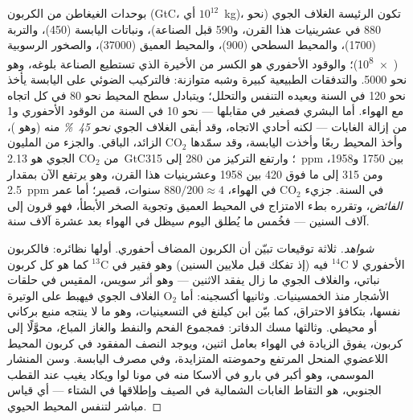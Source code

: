 \begin{proposition}\label{prop:b2:biogeochemical-cycles:carbon}
بوحدات الغيغاطن من الكربون (\unit{GtC}، أي $10^{12}$~kg)، تكون
 الرئيسة الغلاف الجوي (نحو 880 في عشرينيات هذا القرن، و590
قبل الصناعة)، ونباتات اليابسة (450)، والتربة (1700)، والمحيط
السطحي (900)، والمحيط العميق (\num{37000})، والصخور الرسوبية
(\num{e8})؛ والوقود الأحفوري هو الكسر من الأخيرة الذي
تستطيع الصناعة بلوغه، وهو نحو \num{5000}. والتدفقات الطبيعية كبيرة
وشبه متوازنة: فالتركيب الضوئي على اليابسة يأخذ نحو 120 في
السنة ويعيده التنفس والتحلل؛ ويتبادل سطح المحيط
نحو 80 في كل اتجاه مع الهواء. أما  البشري
فصغير في مقابلها --- نحو 10 في السنة من الوقود الأحفوري و1
من إزالة الغابات --- لكنه أحادي الاتجاه، وقد أبقى الغلاف الجوي
\emph{نحو \qty{45}{\%}} منه (وهو \emph{})،
وأخذ المحيط ربعًا وأخذت اليابسة، وقد سمّدها
$\mathrm{CO_2}$ الزائد، الباقي. والجزء من المليون من $\mathrm{CO_2}$ الجوي هو
\qty{2.13}{GtC}؛ وارتفع التركيز من 280 إلى \num{315}~\unit{ppm}
بين 1750 و1958، ومن 315 إلى ما فوق \num{420} بين 1958
وعشرينيات هذا القرن، وهو يرتفع الآن بمقدار \qty{2.5}{ppm} في السنة.  جزيء $\mathrm{CO_2}$ في الهواء، $880/200 \approx 4$ سنوات،
قصير؛ أما عمر \emph{الفائض}، وتقرره بطء
الامتزاج في المحيط العميق وتجوية الصخر الأبطأ، فهو
قرون إلى آلاف السنين --- فخُمس ما يُطلق اليوم سيظل
في الهواء بعد عشرة آلاف سنة.
\end{proposition}
\begin{proof}[شواهد]
ثلاثة توقيعات تبيّن أن الكربون المضاف أحفوري. أولها
نظائره: فالكربون الأحفوري لا $\mathrm{{}^{14}C}$ فيه (إذ تفكك
قبل ملايين السنين) وهو فقير في $\mathrm{{}^{13}C}$ كما هو كل كربون
نباتي، والغلاف الجوي ما زال يفقد الاثنين --- وهو أثر
سويس، المقيس في حلقات الأشجار منذ الخمسينيات. وثانيها أكسجينه:
أما $\mathrm{O_2}$ الغلاف الجوي فيهبط على الوتيرة نفسها، بتكافؤ
الاحتراق، كما بيّن ابن كيلنغ في التسعينيات، وهو ما لا ينتجه
منبع بركاني أو محيطي. وثالثها مسك الدفاتر: فمجموع
الفحم والنفط والغاز المباع، محوَّلًا إلى كربون، يفوق الزيادة
في الهواء بعامل اثنين، ويوجد النصف المفقود في
كربون المحيط اللاعضوي المنحل المرتفع وحموضته المتزايدة، وفي
مصرف اليابسة. وسن المنشار الموسمي، وهو أكبر في بارو في ألاسكا
منه في مونا لوا ويكاد يغيب عند القطب الجنوبي، هو التقاط الغابات
الشمالية في الصيف وإطلاقها في الشتاء --- أي قياس
مباشر لتنفس المحيط الحيوي.
\end{proof}

